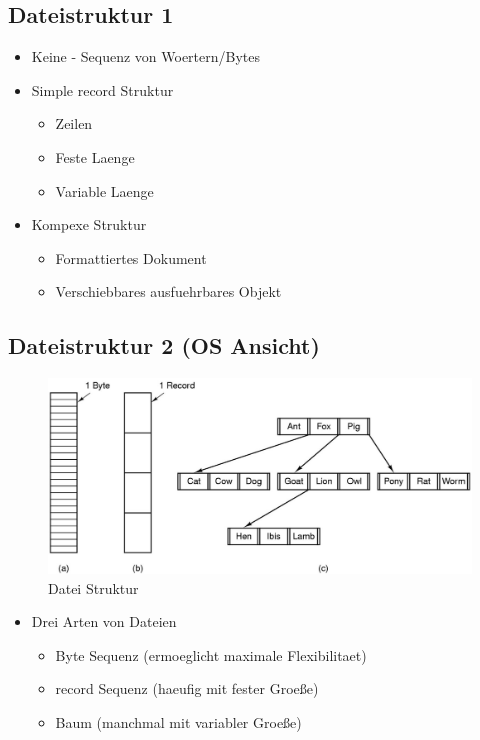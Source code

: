 \documentclass[a4paper]{scrreprt}
\begin{document}
\subsection{Dateistruktur 1}
\begin{itemize}
	\item Keine - Sequenz von Woertern/Bytes
	\item Simple record Struktur
		\begin{itemize}
			\item Zeilen
			\item Feste Laenge
			\item Variable Laenge
		\end{itemize}
	\item Kompexe Struktur
		\begin{itemize}
			\item Formattiertes Dokument
			\item Verschiebbares ausfuehrbares Objekt
		\end{itemize}
\end{itemize}

\subsection{Dateistruktur 2 (OS Ansicht)}

\begin{figure}[ht]
\centering
\includegraphics[scale=0.3]{graphics/file_structure.png}
\caption{Datei Struktur}
\end{figure}

\begin{itemize}
	\item Drei Arten von Dateien
		\begin{itemize}
			\item Byte Sequenz (ermoeglicht maximale Flexibilitaet)
			\item record Sequenz (haeufig mit fester Groeße)
			\item Baum (manchmal mit variabler Groeße)
		\end{itemize}
\end{itemize}
\end{document}
